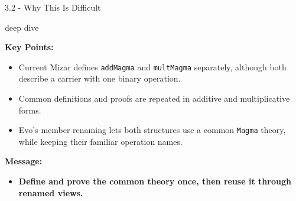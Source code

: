\documentclass[aspectratio=169,11pt]{beamer}
\newcommand{\deepdivetag}{\hfill\colorbox{black!15}{\textcolor{black!65}{\strut\scriptsize\sffamily deep dive}}}
\begin{document}
\begin{frame}[fragile,t]{3.2 - Why This Is Difficult\deepdivetag}
\smallskip
\textbf{Key Points:}
\begin{itemize}
\setlength{\itemsep}{1pt}
\setlength{\parsep}{0pt}
\setlength{\parskip}{0pt}
\item Current Mizar defines \texttt{addMagma} and \texttt{multMagma} separately, although both describe a carrier with one binary operation.
\item Common definitions and proofs are repeated in additive and multiplicative forms.
\item Evo's member renaming lets both structures use a common \texttt{Magma} theory, while keeping their familiar operation names.
\end{itemize}
\smallskip
\textbf{Message:}
\begin{itemize}
\setlength{\itemsep}{1pt}
\setlength{\parsep}{0pt}
\setlength{\parskip}{0pt}
\item \textcolor{blue!55!black}{\textbf{Define and prove the common theory once, then reuse it through renamed views.}}
\end{itemize}
\end{frame}
\end{document}
